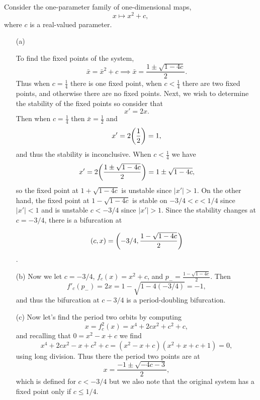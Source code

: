 \documentclass[12pt]{report}
\begin{document}
\begin{solution}

    \noindent
    Consider the one-parameter family of one-dimensional maps,
    \[
        x \mapsto x^2 + c,
    \]
    where $c$ is a real-valued parameter.
    \begin{enumerate}
        \item [(a)]
        
        \noindent
        To find the fixed points of the system,
        \[
            \bar{x} = \bar{x}^2 + c \implies \bar{x} = \frac{1 \pm \sqrt{1 - 4c}}{2}.
        \]
        Thus when $c = \frac{1}{4}$ there is one fixed point, when $c<\frac{1}{4}$ there are two fixed points, and otherwise there are no fixed points. Next, we wish to determine the stability of the fixed points so consider that
        \[
            x' = 2x.
        \]
        Then when $c = \frac{1}{4}$ then $\bar{x} = \frac{1}{2}$ and
        \[
            x' = 2 {\left(\frac{1}{2}\right)} = 1,
        \]
        and thus the stability is inconclusive. When $c < \frac{1}{4}$ we have
        \[
            x' = 2 {\left(\frac{1 \pm \sqrt{1 - 4c}}{2}\right)} = 1 \pm \sqrt{1 - 4c},
        \]
        so the fixed point at $1 + \sqrt{1 - 4c}$ is unstable since $|x'|>1$. On the other hand, the fixed point at $1 - \sqrt{1 - 4c}$ is stable on $-3/4 < c < 1/4$ since $|x'| < 1$ and is unstable $c < -3/4$ since $|x'| > 1$. Since the stability changes at $c=-3/4$, there is a bifurcation at 
        
        \[
            (c,x) = {\left(-3/4,\frac{1 - \sqrt{1 - 4c}}{2}\right)}
        \].


        \item [(b)]
        Now we let $c= -3/4$, $f_c(x) = x^2 + c$, and $p_{-} = \frac{1 - \sqrt{1 - 4c}}{2}$. Then 
        \[
            f'_c(p_{-}) = 2x = 1 - \sqrt{1 - 4(-3/4)} = -1,
        \]
        and thus the bifurcation at $c-3/4$ is a period-doubling bifurcation.
    
        \item [(c)]
        Now let's find the period two orbits by computing 
        \[
            x = f_c^2(x) = x^4 + 2cx^2 + c^2 + c, 
        \]
        and recalling that $0 = x^2 - x + c$ we find
        \[
            x^4 + 2cx^2 - x + c^2 + c = (x^2 - x + c)(x^2 + x + c + 1) = 0,
        \]
        using long division. Thus there the period two points are at
        \[
            x = \frac{-1 \pm \sqrt{-4c - 3}}{2},
        \]
        which is defined for $c < -3/4$ but we also note that the original system has a fixed point only if $c \leq 1/4$.


    \end{enumerate}
\end{solution}

\newpage
\end{document}
